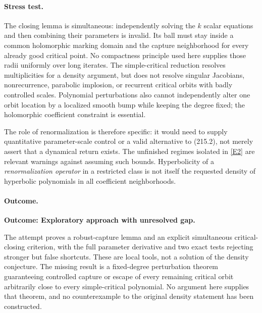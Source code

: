 \documentclass[11pt,a4paper]{article}
\newcommand{\eref}[2]{\hyperlink{extra:#1:#2}{[E#2]}}
\begin{document}
\paragraph{Stress test.}
The closing lemma is simultaneous: independently solving the $k$ scalar
equations and then combining their parameters is invalid. Its ball must
stay inside a common holomorphic marking domain and the capture
neighborhood for every already good critical point. No compactness
principle used here supplies those radii uniformly over long iterates.
The simple-critical reduction resolves multiplicities for a density
argument, but does not resolve singular Jacobians, nonrecurrence,
parabolic implosion, or recurrent critical orbits with badly controlled
scales. Polynomial perturbations also cannot independently alter one
orbit location by a localized smooth bump while keeping the degree fixed;
the holomorphic coefficient constraint is essential.

The role of renormalization is therefore specific: it would need to
supply quantitative parameter-scale control or a valid alternative to
(215.2), not merely assert that a dynamical return exists. The unfinished
regimes isolated in \eref{30006793}{2} are relevant warnings against assuming
such bounds. Hyperbolicity of a \emph{renormalization operator} in a
restricted class is not itself the requested density of hyperbolic
polynomials in all coefficient neighborhoods.

\paragraph{Outcome.}
\textbf{Outcome: Exploratory approach with unresolved gap.}

The attempt proves a robust-capture lemma and an explicit simultaneous
critical-closing criterion, with the full parameter derivative and two
exact tests rejecting stronger but false shortcuts. These are local tools,
not a solution of the density conjecture. The missing result is a
fixed-degree perturbation theorem guaranteeing controlled capture or
escape of every remaining critical orbit arbitrarily close to every
simple-critical polynomial. No argument here supplies that theorem, and
no counterexample to the original density statement has been constructed.
\end{document}
